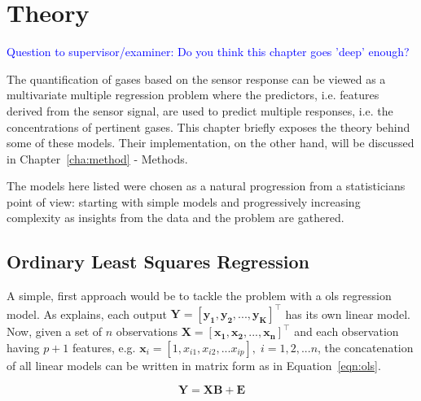 
\chapter{Theory}
\label{cha:theory}

\textcolor{blue}{Question to supervisor/examiner: Do you think this chapter goes 'deep' enough?} 

The quantification of gases based on the sensor response can be viewed as a multivariate multiple regression problem where the predictors, i.e. features derived from the sensor signal, are used to predict multiple responses, i.e. the concentrations of pertinent gases. This chapter briefly exposes the theory behind some of these models. Their implementation, on the other hand, will be discussed in Chapter~\ref{cha:method} - Methods.

The models here listed were chosen as a natural progression from a statisticians point of view: starting with simple models and progressively increasing complexity as insights from the data and the problem are gathered.

\section{Ordinary Least Squares Regression}
\label{sec:linreg}

A simple, first approach would be to tackle the problem with a \acrfull{ols} regression model. As \cite{friedman2001} explains, each output  $\mathbf{Y = [y_1, y_2, ... , y_K]^\intercal} $ has its own linear model. Now, given a set of $n$ observations $\mathbf{X = [x_1, x_2, ..., x_n]^\intercal}$ and each observation having $p+1$ features, e.g. $\mathbf{x}_i = [1,x_{i1}, x_{i2}, ... x_{ip}], \; i = 1,2,...n$, the concatenation of all linear models can be written in matrix form as in Equation~\ref{eqn:ols}.

\begin{equation}
	\label{eqn:ols}
	\mathbf{Y = XB +  E}
\end{equation}

